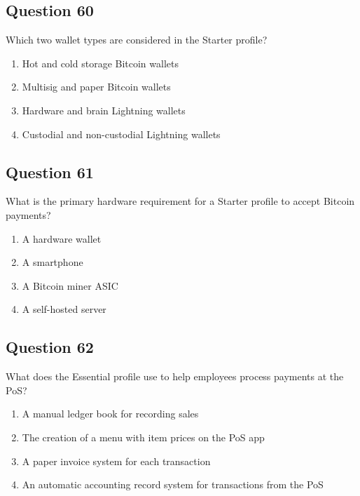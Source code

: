 \documentclass[12pt,a4paper]{article}
\begin{document}
\bigskip


\subsection*{Question 60}
Which two wallet types are considered in the Starter profile?

\begin{enumerate}[label=\Alph*., leftmargin=*]
\item Hot and cold storage Bitcoin wallets
\item Multisig and paper Bitcoin wallets
\item Hardware and brain Lightning wallets
\item Custodial and non-custodial Lightning wallets
\end{enumerate}

\bigskip


\subsection*{Question 61}
What is the primary hardware requirement for a Starter profile to accept Bitcoin payments?

\begin{enumerate}[label=\Alph*., leftmargin=*]
\item A hardware wallet
\item A smartphone
\item A Bitcoin miner ASIC
\item A self-hosted server
\end{enumerate}

\bigskip


\subsection*{Question 62}
What does the Essential profile use to help employees process payments at the PoS?

\begin{enumerate}[label=\Alph*., leftmargin=*]
\item A manual ledger book for recording sales
\item The creation of a menu with item prices on the PoS app
\item A paper invoice system for each transaction
\item An automatic accounting record system for transactions from the PoS
\end{enumerate}
\end{document}
